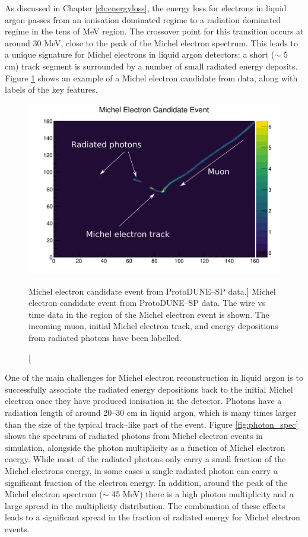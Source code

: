 As discussed in Chapter \ref{ch:energyloss}, the energy loss for electrons in
liquid argon passes from an ionisation dominated regime to a radiation dominated
regime in the tens of MeV region. The crossover point for this transition occurs
at around 30 MeV, close to the peak of the Michel electron spectrum. This
leads to a unique signature for Michel electrons in liquid argon detectors: a
short ($\sim$ 5 cm) track segment is surrounded by a number of small radiated
energy deposits. Figure \ref{fig:michel_event} shows an example of a Michel
electron candidate from \protodune{} data, along with labels of the key
features.

\begin{figure}
	\centering
	\includegraphics[width=\textwidth]{figures/michel_candidate_labelled.pdf}
	\caption
	[Michel electron candidate event from ProtoDUNE--SP data.]
	{Michel electron candidate event from ProtoDUNE--SP data. The wire vs time
	data in the region of the Michel electron event is shown. The incoming muon,
	initial Michel electron track, and energy depositions from radiated photons
	have been labelled.}
	\label{fig:michel_event}
\end{figure}

One of the main challenges for Michel electron reconstruction in liquid argon is
to successfully associate the radiated energy depositions back to the initial
Michel electron once they have produced ionisation in the detector. Photons have
a radiation length of around 20--30 cm in liquid argon, which is many times
larger than the size of the typical track--like part of the event. Figure
\ref{fig:photon_spec} shows the spectrum of radiated photons from Michel
electron events in \protodune{} simulation, alongside the photon multiplicity
as a function of Michel electron energy. While most of the radiated photons
only carry a small fraction of the Michel electrons energy, in some cases a
single radiated photon can carry a significant fraction of the electron
energy. In addition, around the peak of the Michel electron spectrum ($\sim$
45 MeV) there is a high photon multiplicity and a large spread in the
multiplicity distribution. The combination of these effects leads to a
significant spread in the fraction of radiated energy for Michel electron
events.

